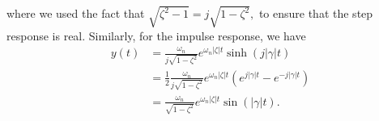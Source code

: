 \documentclass{article}
\numberwithin{equation}{section}
\begin{document}
\begin{enumerate}[label=\textbf{1.\arabic*}]
\begin{enumerate}[label=(\alph*)]
\begin{equation}
    \end{equation}
    where we used the fact that $\sqrt{\zeta^2-1} = j\sqrt{1-\zeta^2},$ to ensure that the step response is real. Similarly, for the impulse response, we have
    \begin{align}
        y(t) &= \frac{\omega_n}{j\sqrt{1-\zeta^2}}e^{\omega_n|\zeta| t}\sinh(j |\gamma| t) \\ 
        &= \frac{1}{2}\frac{\omega_n}{j\sqrt{1-\zeta^2}}e^{\omega_n|\zeta| t}(e^{j|\gamma| t} - e^{-j|\gamma| t}) \\ 
        &= \frac{\omega_n}{\sqrt{1-\zeta^2}}e^{\omega_n|\zeta|t} \sin(|\gamma|t).
    \end{align}
\end{enumerate}
\end{enumerate}
\end{document}
